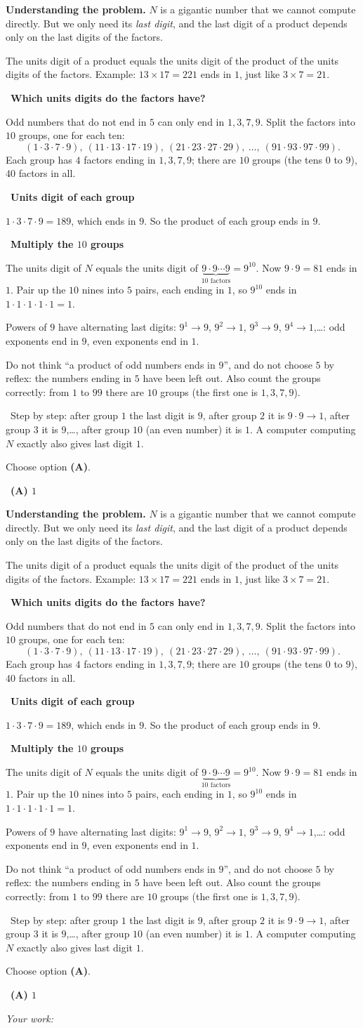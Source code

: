 \documentclass[11pt]{article}
\newif\ifsol \soltrue
\providecommand{\AnsWord}{Đáp số}
\newcommand{\ans}[1]{\par\smallskip{\bfseries\color{tmGreen!88!black}\AnsWord:}\ {\bfseries\color{AnsRed}#1}\par}
\newcommand{\probsol}[1]{%
  \begin{lrbox}{\solmeasure}\begin{minipage}{\dimexpr\linewidth-24pt\relax}#1\end{minipage}\end{lrbox}%
  \ifsol
    \begin{solbox}#1\end{solbox}%
  \else
    \setlength{\solht}{\dimexpr\ht\solmeasure+\dp\solmeasure+0.85cm\relax}%
    \ifdim\solht<1.35cm\setlength{\solht}{1.35cm}\fi
    \ifdim\solht>\StudentMaxWork\setlength{\solht}{\StudentMaxWork}\fi
    \begin{tcolorbox}[colback=white,colframe=Line,boxrule=0.8pt,arc=5pt,
      left=8pt,right=8pt,top=4pt,bottom=4pt,height=\solht]{\footnotesize\color{Slate}\itshape\WorkWord}\end{tcolorbox}%
  \fi}
\newlength{\StudentMaxWork}\setlength{\StudentMaxWork}{7.5cm}
\newcommand{\step}[2]{\par\smallskip\noindent{\bfseries\color{tmBlue!85!black}\StepWord~#1.}\ {\bfseries #2}\par\nopagebreak}
\newcommand{\verify}[1]{\par\smallskip\noindent{\bfseries\color{tmGreen!80!black}\faCheckCircle\ \CheckWord}\ #1\par}
\def\WorkWord{Your work:}
\def\AnsWord{Answer}
\def\StepWord{Step}
\def\CheckWord{Check:}
\begin{document}
\probsol{
\textbf{Understanding the problem.} $N$ is a gigantic number that we cannot compute directly. But we only need its \emph{last digit}, and the last digit of a product depends only on the last digits of the factors.

\begin{recallbox}The units digit of a product equals the units digit of the product of the units digits of the factors. Example: $13\times 17=221$ ends in $1$, just like $3\times 7=21$.\end{recallbox}

\step{1}{Which units digits do the factors have?}
Odd numbers that do not end in $5$ can only end in $1,3,7,9$. Split the factors into $10$ groups, one for each ten:
\[(1\cdot3\cdot7\cdot9),\ (11\cdot13\cdot17\cdot19),\ (21\cdot23\cdot27\cdot29),\ \dots,\ (91\cdot93\cdot97\cdot99).\]
Each group has $4$ factors ending in $1,3,7,9$; there are $10$ groups (the tens $0$ to $9$), $40$ factors in all.

\step{2}{Units digit of each group}
$1\cdot3\cdot7\cdot9=189$, which ends in $9$. So the product of each group ends in $9$.

\step{3}{Multiply the $10$ groups}
The units digit of $N$ equals the units digit of $\underbrace{9\cdot 9\cdots 9}_{10\text{ factors}}=9^{10}$. Now $9\cdot 9=81$ ends in $1$. Pair up the $10$ nines into $5$ pairs, each ending in $1$, so $9^{10}$ ends in $1\cdot1\cdot1\cdot1\cdot1=1$.

\begin{tipbox}Powers of $9$ have alternating last digits: $9^1\to 9$, $9^2\to 1$, $9^3\to 9$, $9^4\to 1$,\dots: odd exponents end in $9$, even exponents end in $1$.\end{tipbox}

\begin{warnbox}Do not think ``a product of odd numbers ends in $9$'', and do not choose $5$ by reflex: the numbers ending in $5$ have been left out. Also count the groups correctly: from $1$ to $99$ there are $10$ groups (the first one is $1,3,7,9$).\end{warnbox}

\verify{Step by step: after group $1$ the last digit is $9$, after group $2$ it is $9\cdot9\to1$, after group $3$ it is $9$,\dots, after group $10$ (an even number) it is $1$. A computer computing $N$ exactly also gives last digit $1$.}
Choose option \textbf{(A)}.
\ans{(A) $1$}
}
\end{document}
